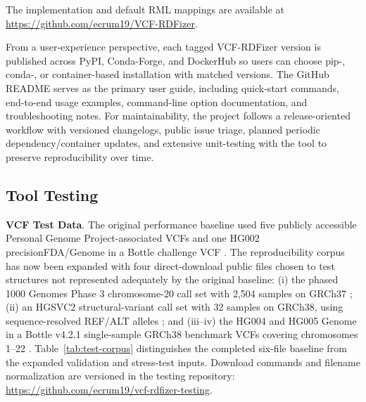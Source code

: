 \documentclass[pdflatex,sn-mathphys-num]{sn-jnl}%
\newenvironment{revision}{\begingroup\color{revisionblue}}{\endgroup}%
\theoremstyle{thmstyleone}%
\theoremstyle{thmstyletwo}%
\theoremstyle{thmstylethree}%
\begin{document}
The implementation and default RML mappings are available at \url{https://github.com/ecrum19/VCF-RDFizer}. 

From a user-experience perspective, each tagged VCF-RDFizer version is published across PyPI, Conda-Forge, and DockerHub so users can choose pip-, conda-, or container-based installation with matched versions.
The GitHub README serves as the primary user guide, including quick-start commands, end-to-end usage examples, command-line option documentation, and troubleshooting notes.
For maintainability, the project follows a release-oriented workflow with versioned changelogs, public issue triage, planned periodic dependency/container updates, and extensive unit-testing with the tool to preserve reproducibility over time.

\subsection{Tool Testing}\label{subsec2.3}

\begin{revision}
\textbf{VCF Test Data}.
The original performance baseline used five publicly accessible Personal Genome Project-associated VCFs \cite{personal_genome_proj} and one HG002 precisionFDA/Genome in a Bottle challenge VCF \cite{nist_gib_2025}. The reproducibility corpus has now been expanded with four direct-download public files chosen to test structures not represented adequately by the original baseline: (i) the phased 1000 Genomes Phase 3 chromosome-20 call set with 2,504 samples on GRCh37 \cite{thousand_genomes_2015}; (ii) an HGSVC2 structural-variant call set with 32 samples on GRCh38, using sequence-resolved REF/ALT alleles \cite{hgsvc_2021}; and (iii--iv) the HG004 and HG005 Genome in a Bottle v4.2.1 single-sample GRCh38 benchmark VCFs covering chromosomes 1--22 \cite{giab_v421_2022}. Table~\ref{tab:test-corpus} distinguishes the completed six-file baseline from the expanded validation and stress-test inputs. Download commands and filename normalization are versioned in the testing repository: \url{https://github.com/ecrum19/vcf-rdfizer-testing}.
\end{revision}
\end{document}
